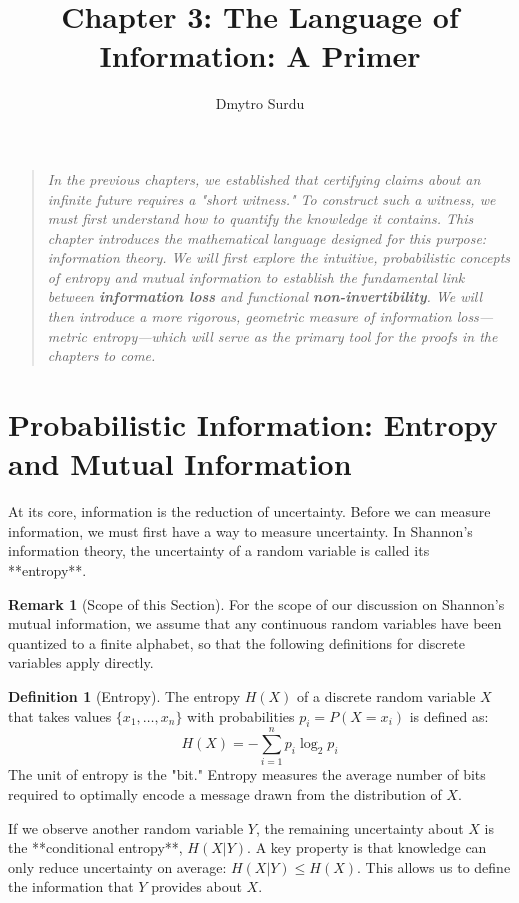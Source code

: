 \documentclass[12pt]{article}
\title{\textbf{Chapter 3: The Language of Information: A Primer}}
\author{Dmytro Surdu}
\date{}
\theoremstyle{definition}
\newtheorem{definition}{Definition}[section]
\newtheorem{remark}{Remark}[section]
\theoremstyle{plain}
\begin{document}
\maketitle

\begin{quote}
\textit{In the previous chapters, we established that certifying claims about an infinite future requires a "short witness." To construct such a witness, we must first understand how to quantify the knowledge it contains. This chapter introduces the mathematical language designed for this purpose: information theory. We will first explore the intuitive, probabilistic concepts of entropy and mutual information to establish the fundamental link between \textbf{information loss} and functional \textbf{non-invertibility}. We will then introduce a more rigorous, geometric measure of information loss—metric entropy—which will serve as the primary tool for the proofs in the chapters to come.}
\end{quote}

\section{Probabilistic Information: Entropy and Mutual Information}

At its core, information is the reduction of uncertainty. Before we can measure information, we must first have a way to measure uncertainty. In Shannon's information theory, the uncertainty of a random variable is called its **entropy**.

\begin{remark}[Scope of this Section]
For the scope of our discussion on Shannon's mutual information, we assume that any continuous random variables have been quantized to a finite alphabet, so that the following definitions for discrete variables apply directly.
\end{remark}

\begin{definition}[Entropy]
The entropy $H(X)$ of a discrete random variable $X$ that takes values $\{x_1, \dots, x_n\}$ with probabilities $p_i = P(X=x_i)$ is defined as:
\[
H(X) = -\sum_{i=1}^{n} p_i \log_2 p_i
\]
The unit of entropy is the "bit." Entropy measures the average number of bits required to optimally encode a message drawn from the distribution of $X$.
\end{definition}

If we observe another random variable $Y$, the remaining uncertainty about $X$ is the **conditional entropy**, $H(X|Y)$. A key property is that knowledge can only reduce uncertainty on average: $H(X|Y) \le H(X)$. This allows us to define the information that $Y$ provides about $X$.
\end{document}
